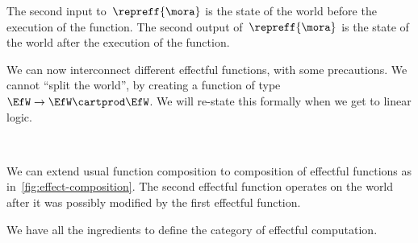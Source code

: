 The second input to~$\repreff{\mora}$ is the state of the world before the execution of the function.
The second output of~$\repreff{\mora}$ is the state of the world after the execution of the function.

We can now interconnect different effectful functions, with some precautions.
We cannot ``split the world'', by creating a function of type~$\EfW \to \EfW \cartprod \EfW$.
We will re-state this formally when we get to linear logic.

\begin{marginfigure}
    \centering
    \\
    \caption{}
    \label{fig:effect-composition}
\end{marginfigure}

We can extend usual function composition to composition of effectful functions as in~\cref{fig:effect-composition}.
The second effectful function operates on the world after it was possibly modified by the first effectful function.

We have all the ingredients to define the category \Effects of effectful computation.

